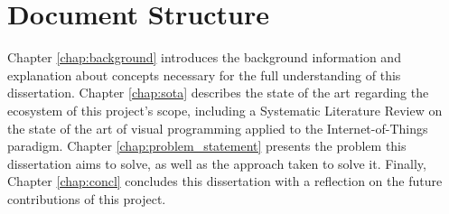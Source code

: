 \section{Document Structure} \label{sec:document structure}

Chapter \ref{chap:background} introduces the background information and explanation about concepts necessary for the full understanding of this dissertation. Chapter \ref{chap:sota} describes the state of the art regarding the ecosystem of this project's scope, including a Systematic Literature Review on the state of the art of visual programming applied to the Internet-of-Things paradigm. Chapter \ref{chap:problem_statement} presents the problem this dissertation aims to solve, as well as the approach taken to solve it. Finally, Chapter \ref{chap:concl} concludes this dissertation with a reflection on the future contributions of this project.


